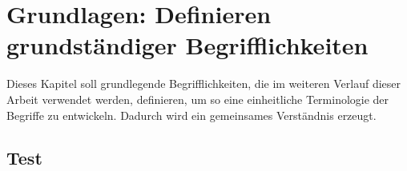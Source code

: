 \chapter{Grundlagen: Definieren grundständiger Begrifflichkeiten}
Dieses Kapitel soll grundlegende Begrifflichkeiten, die im weiteren Verlauf dieser Arbeit verwendet werden, definieren, um so eine einheitliche Terminologie der Begriffe zu entwickeln. Dadurch wird ein gemeinsames Verständnis erzeugt.

\section{Test}